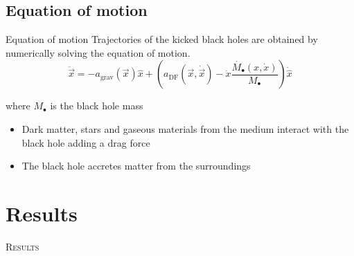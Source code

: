 \documentclass{beamer}
\begin{document}
\subsection{Equation of motion}
\begin{frame}{Equation of motion}
	Trajectories of the kicked black holes are obtained by numerically solving the equation of motion.
	\begin{equation}\label{eq: equationMotion}
		\ddot{\vec{x}} = -a_\text{grav}(\vec{x})\hat{x} + \left(a_\text{DF}(\vec{x}, \dot{\vec{x}})-\dot{x}\dfrac{\dot{M_\bullet}(x, \dot{x})}{M_\bullet}\right)\dot{\hat{x}} 
	\end{equation}
	
	where $M_\bullet$ is the black hole mass
	
	\begin{itemize}
		\item Dark matter, stars and gaseous materials from the medium interact with the black hole adding a drag force
		\item The black hole accretes matter from the surroundings
	\end{itemize}
\end{frame}

\section{Results}
\begin{frame}
	\centering
	\Huge
	\scshape
	Results
\end{frame}
\end{document}
